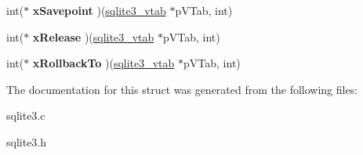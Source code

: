 \begin{DoxyCompactItemize}
\item 
int($\ast$ {\bfseries x\+Savepoint} )(\hyperlink{structsqlite3__vtab}{sqlite3\+\_\+vtab} $\ast$p\+V\+Tab, int)\hypertarget{structsqlite3__module_af90f1df803fce1b90048864aeeeee890}{}\label{structsqlite3__module_af90f1df803fce1b90048864aeeeee890}

\item 
int($\ast$ {\bfseries x\+Release} )(\hyperlink{structsqlite3__vtab}{sqlite3\+\_\+vtab} $\ast$p\+V\+Tab, int)\hypertarget{structsqlite3__module_a8dcaa6dc6d9563c8da57e4c8c5055609}{}\label{structsqlite3__module_a8dcaa6dc6d9563c8da57e4c8c5055609}

\item 
int($\ast$ {\bfseries x\+Rollback\+To} )(\hyperlink{structsqlite3__vtab}{sqlite3\+\_\+vtab} $\ast$p\+V\+Tab, int)\hypertarget{structsqlite3__module_a767753c6c97d1f622e5113367a0547b5}{}\label{structsqlite3__module_a767753c6c97d1f622e5113367a0547b5}

\end{DoxyCompactItemize}


The documentation for this struct was generated from the following files\+:\begin{DoxyCompactItemize}
\item 
sqlite3.\+c\item 
sqlite3.\+h\end{DoxyCompactItemize}
